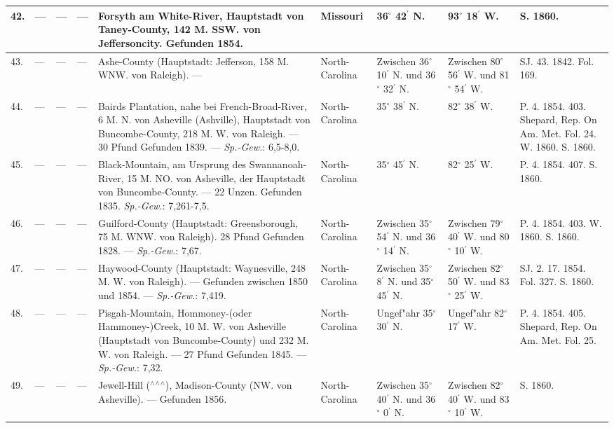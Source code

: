 \documentclass[a4paper, 8pt, oneside, polutonikogreek, german]{article}
\begin{document}
\begin{center}
\begin{longtable}{|p{3mm}|p{6mm}|p{9mm}|p{16mm}|p{26mm}|p{20mm}|p{13mm}|p{13mm}|p{13mm}|}
        42. & --- & --- & --- & Forsyth am White-River, Hauptstadt von Taney-County, 142 M. SSW. von Jeffersoncity. Gefunden 1854. & Missouri & 36$^\circ$ 42$^\prime$ N. & 93$^\circ$ 18$^\prime$ W. & S. 1860. \\ \hline
        43. & --- & --- & --- & Ashe-County (Hauptstadt: Jefferson, 158 M. WNW. von Raleigh). --- & North-Carolina & Zwischen 36$^\circ$ 10$^\prime$ N. und 36$^\circ$ 32$^\prime$ N. & Zwischen 80$^\circ$ 56$^\prime$ W. und 81$^\circ$ 54$^\prime$ W. & SJ. 43. 1842. Fol. 169. \\ \hline
        44. & --- & --- & --- & Bairds Plantation, nahe bei French-Broad-River, 6 M. N. von Asheville (Ashville), Hauptstadt von Buncombe-County, 218 M. W. von Raleigh. --- 30 Pfund Gefunden 1839. --- \emph{Sp.-Gew.}: 6,5-8,0. & North-Carolina & 35$^\circ$ 38$^\prime$ N. & 82$^\circ$ 38$^\prime$ W. & P. 4. 1854. 403. Shepard, Rep. On Am. Met. Fol. 24. W. 1860. S. 1860. \\ \hline
        45. & --- & --- & --- & Black-Mountain, am Ursprung des Swannanoah-River, 15 M. NO. von Asheville, der Hauptstadt von Buncombe-County. --- 22 Unzen. Gefunden 1835. \emph{Sp.-Gew.}: 7,261-7,5. & North-Carolina & 35$^\circ$ 45$^\prime$ N. & 82$^\circ$ 25$^\prime$ W. & P. 4. 1854. 407. S. 1860. \\ \hline
        46. & --- & --- & --- & Guilford-County (Hauptstadt: Greensborough, 75 M. WNW. von Raleigh). 28 Pfund Gefunden 1828. --- \emph{Sp.-Gew.}: 7,67. & North-Carolina & Zwischen 35$^\circ$ 54$^\prime$ N. und 36$^\circ$ 14$^\prime$ N. & Zwischen 79$^\circ$ 40$^\prime$ W. und 80$^\circ$ 10$^\prime$ W. & P. 4. 1854. 403. W. 1860. S. 1860. \\ \hline
        47. & --- & --- & --- & Haywood-County (Hauptstadt: Waynesville, 248 M. W. von Raleigh). --- Gefunden zwischen 1850 und 1854. --- \emph{Sp.-Gew.}: 7,419. & North-Carolina & Zwischen 35$^\circ$ 8$^\prime$ N. und 35$^\circ$ 45$^\prime$ N. & Zwischen 82$^\circ$ 50$^\prime$ W. und 83$^\circ$ 25$^\prime$ W. & SJ. 2. 17. 1854. Fol. 327. S. 1860. \\ \hline
        48. & --- & --- & --- & Pisgah-Mountain, Hommoney-(oder Hammoney-)Creek, 10 M. W. von Asheville (Hauptstadt von Buncombe-County) und 232 M. W. von Raleigh. --- 27 Pfund Gefunden 1845. --- \emph{Sp.-Gew.}: 7,32. & North-Carolina & Ungef"ahr 35$^\circ$ 30$^\prime$ N. & Ungef"ahr 82$^\circ$ 17$^\prime$ W. & P. 4. 1854. 405. Shepard, Rep. On Am. Met. Fol. 25. \\ \hline
        49. & --- & --- & --- & Jewell-Hill ($^\wedge$$^\wedge$$^\wedge$), Madison-County (NW. von Asheville). --- Gefunden 1856. & North-Carolina & Zwischen 35$^\circ$ 40$^\prime$ N. und 36$^\circ$ 0$^\prime$ N. & Zwischen 82$^\circ$ 40$^\prime$ W. und 83$^\circ$ 10$^\prime$ W. & S. 1860. \\ \hline

\end{longtable}
\end{center}
\end{document}

